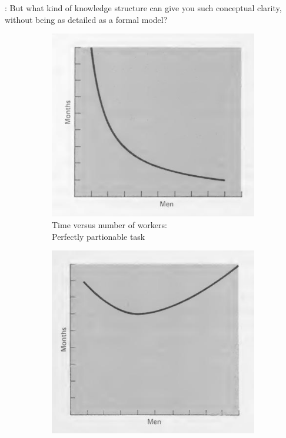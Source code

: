 \documentclass[runningheads]{llncs}
\newcommand{\T}{Tomas}
\newcommand{\says}[2][gg]{\vspace{0.5em}\noindent\hangindent=0.5cm{\textsc{#1}}: #2}
\begin{document}
\says[\T]{But what kind of knowledge structure can give you such conceptual clarity, without being as detailed as a formal model?}

\begin{figure}[t]
\vspace{-0.5em}
\centering
\begin{subfigure}{0.49\textwidth}
  \centering
   \noindent
   \includegraphics[scale=0.3]{figures/mm1.png}
   \caption{Time versus number of workers:\\Perfectly partionable task}
   \label{fig:xx}
\end{subfigure}
\hfill
\begin{subfigure}{0.49\textwidth}
  \centering
   \noindent
   \includegraphics[scale=0.3]{figures/mm2.png}

\end{subfigure}
\end{figure}
\end{document}
